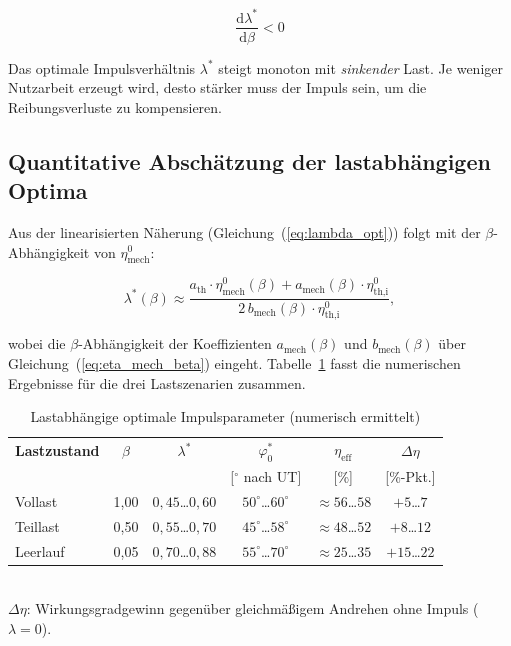 ﻿\documentclass[a4paper,12pt]{article}
\begin{document}
\begin{equation}
  \boxed{
    \frac{\mathrm{d}\lambda^*}{\mathrm{d}\beta} < 0
  }
  \label{eq:dlambda_dbeta}
\end{equation}

\noindent
Das optimale Impulsverhältnis $\lambda^*$ steigt monoton mit \emph{sinkender} Last.
Je weniger Nutzarbeit erzeugt wird, desto stärker muss der Impuls sein, um die
Reibungsverluste zu kompensieren.

\subsection{Quantitative Abschätzung der lastabhängigen Optima}

Aus der linearisierten Näherung (Gleichung~(\ref{eq:lambda_opt})) folgt mit der
$\beta$-Abhängigkeit von $\eta_\text{mech}^0$:

\begin{equation}
  \lambda^*(\beta) \approx
    \frac{a_\text{th} \cdot \eta_\text{mech}^0(\beta)
        + a_\text{mech}(\beta) \cdot \eta_\text{th,i}^0}
    {2\, b_\text{mech}(\beta) \cdot \eta_\text{th,i}^0},
  \label{eq:lambda_opt_beta}
\end{equation}

\noindent
wobei die $\beta$-Abhängigkeit der Koeffizienten $a_\text{mech}(\beta)$ und
$b_\text{mech}(\beta)$ über Gleichung~(\ref{eq:eta_mech_beta}) eingeht.
Tabelle~\ref{tab:last_optima} fasst die numerischen Ergebnisse für die drei
Lastszenarien zusammen.

\begin{table}[h]
\centering
\caption{Lastabhängige optimale Impulsparameter (numerisch ermittelt)}
\label{tab:last_optima}
\begin{tabular}{lccccc}
\toprule
\textbf{Lastzustand} & $\beta$ & $\lambda^*$ & $\varphi_0^*$ & $\eta_\text{eff}$ & $\Delta\eta$ \\
 & & & [$^\circ$ nach UT] & [\%] & [\%-Pkt.] \\
\midrule
Vollast   & 1{,}00 & $0{,}45$\ldots$0{,}60$ & $50^\circ$\ldots$60^\circ$ & $\approx 56$\ldots$58$ & $+5$\ldots$7$ \\
Teillast  & 0{,}50 & $0{,}55$\ldots$0{,}70$ & $45^\circ$\ldots$58^\circ$ & $\approx 48$\ldots$52$ & $+8$\ldots$12$ \\
Leerlauf  & 0{,}05 & $0{,}70$\ldots$0{,}88$ & $55^\circ$\ldots$70^\circ$ & $\approx 25$\ldots$35$ & $+15$\ldots$22$ \\
\bottomrule
\end{tabular}
\\[0.5em]
\small $\Delta\eta$: Wirkungsgradgewinn gegenüber gleichmäßigem Andrehen ohne Impuls ($\lambda = 0$).
\end{table}
\end{document}
